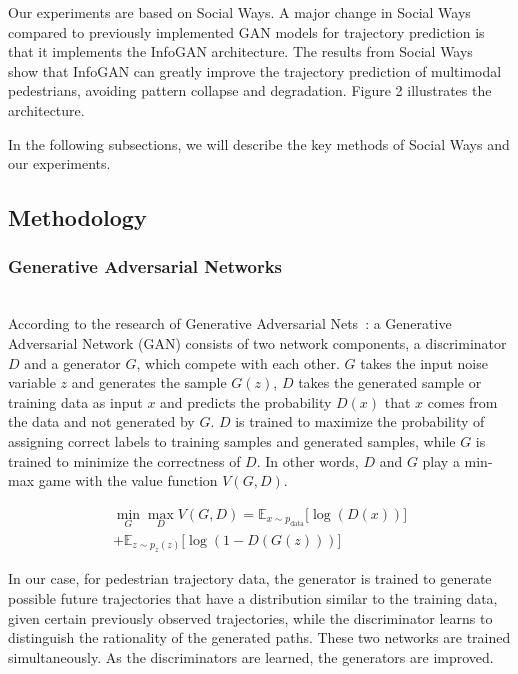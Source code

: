 Our experiments are based on Social Ways. A major change in Social Ways compared to previously implemented GAN models for trajectory prediction is that it implements the InfoGAN architecture. The results from Social Ways~\cite{DBLP:journals/corr/abs-1904-09507} show that InfoGAN can greatly improve the trajectory prediction of multimodal pedestrians, avoiding pattern collapse and degradation. Figure 2 illustrates the architecture.


In the following subsections, we will describe the key methods of Social Ways and our experiments.

\subsection{Methodology}


\subsubsection{Generative Adversarial Networks}
\hfill \\
According to the research of Generative Adversarial Nets~\cite{gan}: a Generative Adversarial Network (GAN) consists of two network components, a discriminator $D$ and a generator $G$, which compete with each other. $G$ takes the input noise variable $z$ and generates the sample $G(z)$, $D$ takes the generated sample or training data as input $x$ and predicts the probability $D(x)$ that $x$ comes from the data and not generated by $G$. $D$ is trained to maximize the probability of assigning correct labels to training samples and generated samples, while $G$ is trained to minimize the correctness of $D$. In other words, $D$ and $G$ play a min-max game with the value function $V(G, D)$.

\begin{multline}
  \min_{G} \max_{D} V(G, D) = \mathbb{E}_{x \sim p_{\text{data}}} \lbrack \log(D(x))\rbrack \\ + \mathbb{E}_{z \sim p_{z}(z)} \lbrack \log(1 - D(G(z))) \rbrack
\end{multline}

In our case, for pedestrian trajectory data, the generator is trained to generate possible future trajectories that have a distribution similar to the training data, given certain previously observed trajectories, while the discriminator learns to distinguish the rationality of the generated paths. These two networks are trained simultaneously. As the discriminators are learned, the generators are improved.

